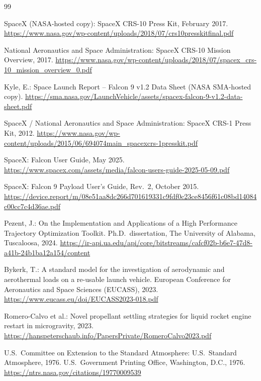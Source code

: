 \begin{thebibliography}{99}
\small
\setlength{\itemsep}{0pt}
\setlength{\parsep}{0pt}

SpaceX (NASA-hosted copy):
SpaceX CRS-10 Press Kit, February 2017.
\url{https://www.nasa.gov/wp-content/uploads/2018/07/crs10presskitfinal.pdf}

National Aeronautics and Space Administration:
SpaceX CRS-10 Mission Overview, 2017.
\url{https://www.nasa.gov/wp-content/uploads/2018/07/spacex_crs-10_mission_overview_0.pdf}

Kyle, E.:
Space Launch Report -- Falcon 9 v1.2 Data Sheet (NASA SMA-hosted copy).
\url{https://sma.nasa.gov/LaunchVehicle/assets/spacex-falcon-9-v1.2-data-sheet.pdf}

SpaceX / National Aeronautics and Space Administration:
SpaceX CRS-1 Press Kit, 2012.
\url{https://www.nasa.gov/wp-content/uploads/2015/06/694074main_spacexcrs-1presskit.pdf}

SpaceX:
Falcon User Guide, May 2025.
\url{https://www.spacex.com/assets/media/falcon-users-guide-2025-05-09.pdf}

SpaceX:
Falcon 9 Payload User's Guide, Rev.~2, October 2015.
\url{https://device.report/m/08e51aa8dc266d701619331c9fdf0c23ce8456f61c08bd14084c00cc7c4d36ae.pdf}

Pezent, J.:
On the Implementation and Applications of a High Performance Trajectory
Optimization Toolkit.
Ph.D.\ dissertation, The University of Alabama, Tuscaloosa, 2024.
\url{https://ir-api.ua.edu/api/core/bitstreams/cafcf02b-b6e7-47d8-a41b-24b1ba12a154/content}

Bykerk, T.:
A standard model for the investigation of aerodynamic and aerothermal loads
on a re-usable launch vehicle.
European Conference for Aeronautics and Space Sciences (EUCASS), 2023.
\url{https://www.eucass.eu/doi/EUCASS2023-018.pdf}

Romero-Calvo et al.:
Novel propellant settling strategies for liquid rocket engine restart in
microgravity, 2023.
\url{https://hanspeterschaub.info/PapersPrivate/RomeroCalvo2023.pdf}

U.S.\ Committee on Extension to the Standard Atmosphere:
U.S.\ Standard Atmosphere, 1976.
U.S.\ Government Printing Office, Washington, D.C., 1976.
\url{https://ntrs.nasa.gov/citations/19770009539}


\end{thebibliography}
